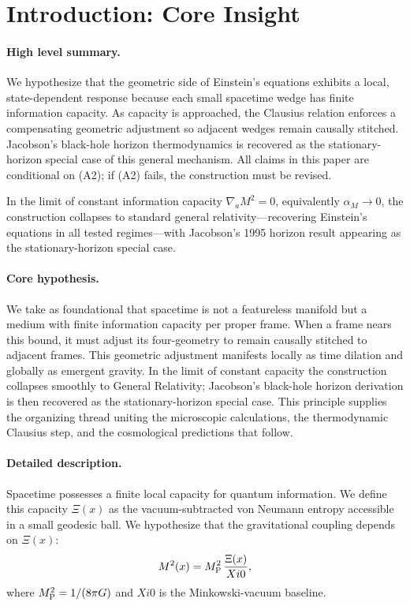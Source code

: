 \documentclass[aps,prd,onecolumn,superscriptaddress,nofootinbib]{revtex4-2}
\def\XiVac{Xi0}%
\newcommand{\XiVac}{\Xi_0}
\begin{document}
\section{Introduction: Core Insight}
\label{sec:intro}

\paragraph{High level summary.}
We hypothesize that the geometric side of Einstein’s equations exhibits a local, state-dependent response because each small spacetime wedge has finite information capacity. As capacity is approached, the Clausius relation enforces a compensating geometric adjustment so adjacent wedges remain causally stitched. Jacobson’s black-hole horizon thermodynamics is recovered as the stationary-horizon special case of this general mechanism. All claims in this paper are conditional on (A2); if (A2) fails, the construction must be revised.

In the limit of constant information capacity \(\nabla_a M^2=0\), equivalently \(\alpha_M\!\to\!0\), the construction collapses to standard general relativity—recovering Einstein’s equations in all tested regimes—with Jacobson’s 1995 horizon result appearing as the stationary-horizon special case.

\paragraph{Core hypothesis.}
We take as foundational that spacetime is not a featureless manifold but a medium with finite information capacity per proper frame. When a frame nears this bound, it must adjust its four-geometry to remain causally stitched to adjacent frames. This geometric adjustment manifests locally as time dilation and globally as emergent gravity. In the limit of constant capacity the construction collapses smoothly to General Relativity; Jacobson’s black-hole horizon derivation is then recovered as the stationary-horizon special case. This principle supplies the organizing thread uniting the microscopic calculations, the thermodynamic Clausius step, and the cosmological predictions that follow.

\paragraph{Detailed description.}
Spacetime possesses a finite local capacity for quantum information. We define this capacity \(\Xi(x)\) as the vacuum-subtracted von Neumann entropy accessible in a small geodesic ball. We hypothesize that the gravitational coupling depends on \(\Xi(x)\):
\begin{equation}
M^2(x) = M_{\rm P}^2 \, \frac{\Xi(x)}{\XiVac},
\end{equation}
where \(M_{\rm P}^2 = 1/(8\pi G)\) and \(\XiVac\) is the Minkowski-vacuum baseline.
\end{document}
